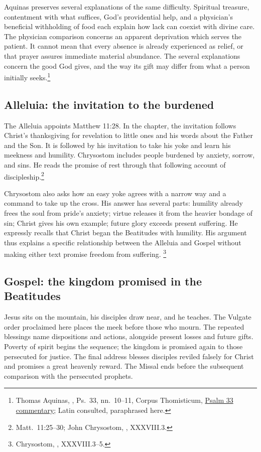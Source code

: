 Aquinas preserves several explanations of the same difficulty. Spiritual
treasure, contentment with what suffices, God's providential help, and a
physician's beneficial withholding of food each explain how lack can coexist
with divine care. The physician comparison concerns an apparent deprivation
which serves the patient. It cannot mean that every absence is already
experienced as relief, or that prayer assures immediate material abundance.
The several explanations concern the good God gives, and the way its gift
may differ from what a person initially seeks.\footnote{Thomas Aquinas,
, Ps.~33, nn.~10--11, Corpus Thomisticum,
\href{https://www.corpusthomisticum.org/cps31.html}{Psalm 33 commentary};
Latin consulted, paraphrased here.}

\subsection{Alleluia: the invitation to the burdened}
The Alleluia appoints Matthew 11:28. In the chapter, the invitation follows
Christ's thanksgiving for revelation to little ones and his words about the
Father and the Son. It is followed by his invitation to take his yoke and
learn his meekness and humility. Chrysostom includes people burdened by
anxiety, sorrow, and sins. He reads the promise of rest through that
following account of discipleship.\footnote{Matt.~11:25--30;
John Chrysostom, , XXXVIII.3.}

Chrysostom also asks how an easy yoke agrees with a narrow way and a command
to take up the cross. His answer has several parts: humility already frees
the soul from pride's anxiety; virtue releases it from the heavier bondage of
sin; Christ gives his own example; future glory exceeds present suffering.
He expressly recalls that Christ began the Beatitudes with humility.
His argument thus explains a specific relationship between the Alleluia
and Gospel without making either text promise freedom from suffering.
\footnote{Chrysostom, , XXXVIII.3--5.}

\subsection{Gospel: the kingdom promised in the Beatitudes}
Jesus sits on the mountain, his disciples draw near, and he teaches. The
Vulgate order proclaimed here places the meek before those who mourn.
The repeated blessings name dispositions and actions, alongside present
losses and future gifts. Poverty of spirit begins the sequence; the kingdom
is promised again to those persecuted for justice. The final address blesses
disciples reviled falsely for Christ and promises a great heavenly reward.
The Missal ends before the subsequent comparison with the persecuted prophets.


